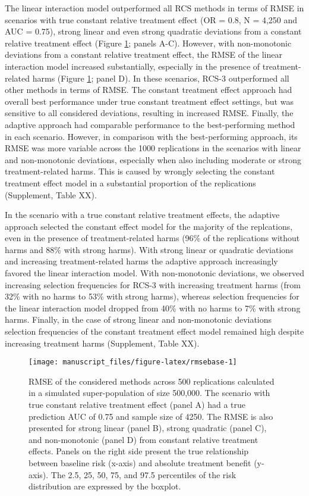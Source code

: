 \documentclass[]{elsarticle} %
\begin{document}
The linear interaction model outperformed all RCS methods in terms of
RMSE in scenarios with true constant relative treatment effect (OR =
0.8, N = 4,250 and AUC = 0.75), strong linear and even strong quadratic
deviations from a constant relative treatment effect (Figure
\ref{fig:rmsebase}; panels A-C). However, with non-monotonic deviations
from a constant relative treatment effect, the RMSE of the linear
interaction model increased substantially, especially in the presence of
treatment-related harms (Figure \ref{fig:rmsebase}; panel D). In these
scenarios, RCS-3 outperformed all other methods in terms of RMSE. The
constant treatment effect approach had overall best performance under
true constant treatment effect settings, but was sensitive to all
considered deviations, resulting in increased RMSE. Finally, the
adaptive approach had comparable performance to the best-performing
method in each scenario. However, in comparison with the best-performing
approach, its RMSE was more variable across the 1000 replications in the
scenarios with linear and non-monotonic deviations, especially when also
including moderate or strong treatment-related harms. This is caused by
wrongly selecting the constant treatment effect model in a substantial
proportion of the replications (Supplement, Table XX).

In the scenario with a true constant relative treatment effects, the
adaptive approach selected the constant effect model for the majority of
the replcations, even in the presence of treatment-related harms (96\%
of the replications without harms and 88\% with strong harms). With
strong linear or quadratic deviations and increasing treatment-related
harms the adaptive approach increasingly favored the linear interaction
model. With non-monotonic deviations, we observed increasing selection
frequencies for RCS-3 with increasing treatment harms (from 32\% with no
harms to 53\% with strong harms), whereas selection frequencies for the
linear interaction model dropped from 40\% with no harms to 7\% with
strong harms. Finally, in the case of strong linear and non-monotonic
deviations selection frequencies of the constant treatment effect model
remained high despite increasing treatment harms (Supplement, Table XX).

\begin{figure}
\texttt{[image: manuscript\_files/figure-latex/rmsebase-1]} \caption{RMSE of the considered methods across 500 replications calculated in a simulated super-population of size 500,000. The scenario with true constant relative treatment effect (panel A) had a true prediction AUC of 0.75 and sample size of 4250. The RMSE is also presented for strong linear (panel B), strong quadratic (panel C), and non-monotonic (panel D) from constant relative treatment effects. Panels on the right side present the true relationship between baseline risk (x-axis) and absolute treatment benefit (y-axis). The 2.5, 25, 50, 75, and 97.5 percentiles of the risk distribution are expressed by the boxplot.}\label{fig:rmsebase}
\end{figure}
\end{document}
